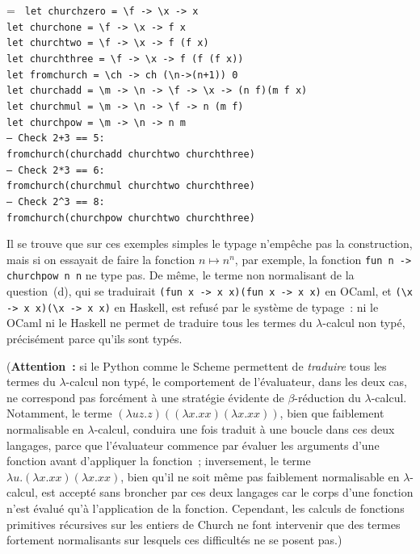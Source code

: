 \documentclass[12pt,a4paper]{article}
\theoremstyle{definition}
\newif\ifcorrige
\newenvironment{corrige}%
{\ifcorrige\relax\else\setbox0=\vbox\bgroup\fi%
\smallbreak\footnotesize\noindent{\underbar{\textit{Corrigé.}}\quad}}
{{\hbox{}\nobreak\hfill\checkmark}%
\ifcorrige\relax\else\egroup\fi\par}
\begin{document}
\begin{corrige}
\noindent\texttt{%
let churchzero = \textbackslash f -> \textbackslash x -> x\\
let churchone = \textbackslash f -> \textbackslash x -> f x\\
let churchtwo = \textbackslash f -> \textbackslash x -> f (f x)\\
let churchthree = \textbackslash f -> \textbackslash x -> f (f (f x))\\
let fromchurch = \textbackslash ch -> ch (\textbackslash n->(n+1)) 0\\
let churchadd = \textbackslash m -> \textbackslash n -> \textbackslash f -> \textbackslash x -> (n f)(m f x)\\
let churchmul = \textbackslash m -> \textbackslash n -> \textbackslash f -> n (m f)\\
let churchpow = \textbackslash m -> \textbackslash n -> n m\\
-- Check 2+3 == 5:\\
fromchurch(churchadd churchtwo churchthree)\\
-- Check 2*3 == 6:\\
fromchurch(churchmul churchtwo churchthree)\\
-- Check 2\textasciicircum 3 == 8:\\
fromchurch(churchpow churchtwo churchthree)
}

Il se trouve que sur ces exemples simples le typage n'empêche pas la
construction, mais si on essayait de faire la fonction $n \mapsto
n^n$, par exemple, la fonction \texttt{fun n -> churchpow n n} ne type
pas.  De même, le terme non normalisant de la question (d), qui se
traduirait \texttt{(fun x -> x x)(fun x -> x x)} en OCaml, et
\texttt{(\textbackslash x -> x x)(\textbackslash x -> x x)} en
Haskell, est refusé par le système de typage : ni le OCaml ni le
Haskell ne permet de traduire tous les termes du $\lambda$-calcul non
typé, précisément parce qu'ils sont typés.

(\textbf{Attention :} si le Python comme le Scheme permettent de
\emph{traduire} tous les termes du $\lambda$-calcul non typé, le
comportement de l'évaluateur, dans les deux cas, ne correspond pas
forcément à une stratégie évidente de $\beta$-réduction du
$\lambda$-calcul.  Notamment, le terme $(\lambda uz.z)((\lambda
x.xx)(\lambda x.xx))$, bien que faiblement normalisable en
$\lambda$-calcul, conduira une fois traduit à une boucle dans ces deux
langages, parce que l'évaluateur commence par évaluer les arguments
d'une fonction avant d'appliquer la fonction ; inversement, le terme
$\lambda u.(\lambda x.xx)(\lambda x.xx)$, bien qu'il ne soit même pas
faiblement normalisable en $\lambda$-calcul, est accepté sans broncher
par ces deux langages car le corps d'une fonction n'est évalué qu'à
l'application de la fonction.  Cependant, les calculs de fonctions
primitives récursives sur les entiers de Church ne font intervenir que
des termes fortement normalisants sur lesquels ces difficultés ne se
posent pas.)
\end{corrige}
\end{document}
